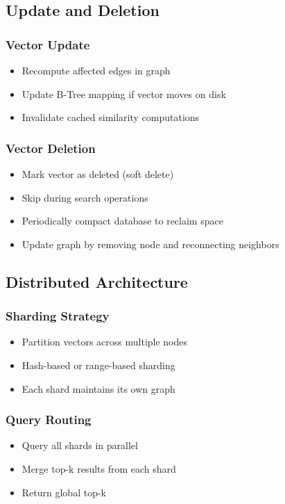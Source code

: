 \documentclass[12pt,a4paper]{article}
\begin{document}
\subsection{Update and Deletion}

\subsubsection{Vector Update}
\begin{itemize}
    \item Recompute affected edges in graph
    \item Update B-Tree mapping if vector moves on disk
    \item Invalidate cached similarity computations
\end{itemize}

\subsubsection{Vector Deletion}
\begin{itemize}
    \item Mark vector as deleted (soft delete)
    \item Skip during search operations
    \item Periodically compact database to reclaim space
    \item Update graph by removing node and reconnecting neighbors
\end{itemize}

\subsection{Distributed Architecture}

\subsubsection{Sharding Strategy}
\begin{itemize}
    \item Partition vectors across multiple nodes
    \item Hash-based or range-based sharding
    \item Each shard maintains its own graph
\end{itemize}

\subsubsection{Query Routing}
\begin{itemize}
    \item Query all shards in parallel
    \item Merge top-k results from each shard
    \item Return global top-k
\end{itemize}
\end{document}
